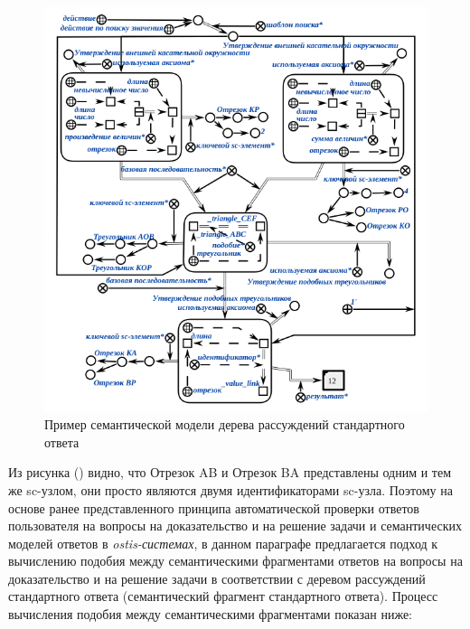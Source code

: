 \begin{figure}[H]
	\includegraphics[scale=0.6]{author/part7/figures/inference_tree_example_SCg.png}
	\caption{Пример семантической модели дерева рассуждений стандартного ответа}
	\label{fig:ITE_example}
\end{figure}

Из рисунка (\textit{}) видно, что Отрезок AB и Отрезок BA представлены одним и тем же sc-узлом, они просто являются двумя идентификаторами sc-узла. Поэтому на основе ранее представленного принципа автоматической проверки ответов пользователя на вопросы на доказательство и на решение задачи и семантических моделей ответов в \textit{ostis-системах}, в данном параграфе предлагается подход к вычислению подобия между семантическими фрагментами ответов на вопросы на доказательство и на решение задачи в соответствии с деревом рассуждений стандартного ответа (семантический фрагмент стандартного ответа). Процесс вычисления подобия между семантическими фрагментами показан ниже:

